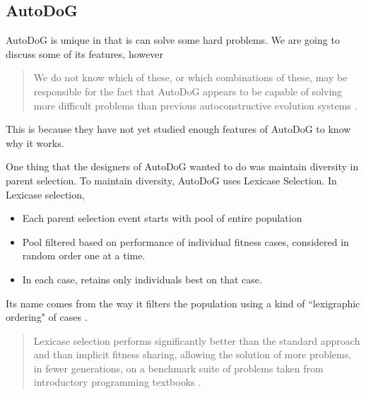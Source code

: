 \documentclass{sig-alternate}
\begin{document}

\subsection{AutoDoG}
\label{sec:autodog}
AutoDoG is unique in that is can solve some hard problems.  We are going to discuss some of its features, however
\begin{quotation}
	We do not know which of these, or which combinations of these, may be responsible for the fact that AutoDoG appears to be capable of solving more difficult problems than previous autoconstructive evolution systems \cite{spector:2016}.
\end{quotation}
This is because they have not yet studied enough features of AutoDoG to know why it works.

One thing that the designers of AutoDoG wanted to do was maintain diversity in parent selection. To maintain diversity, AutoDoG uses Lexicase Selection. In Lexicase selection,
\begin{itemize}
	\item Each parent selection event starts with pool of entire population
	\item Pool filtered based on performance of individual fitness cases, considered in random order one at a time.
	\item In each case, retains only individuals best on that case.
\end{itemize}

Its name comes from the way it filters the population using a kind of ``lexigraphic ordering" of cases \cite{spector:2016}.
\begin{quotation}
	Lexicase selection performs significantly better than the standard approach and than implicit fitness sharing, allowing the solution of more problems, in fewer generations, on a benchmark suite of problems taken from introductory programming textbooks \cite{spector:2016}.
\end{quotation}
\end{document}
